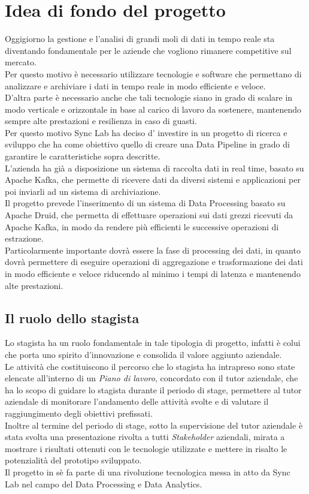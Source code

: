 \section{Idea di fondo del progetto}
Oggigiorno la gestione e l'analisi di grandi moli di dati in tempo reale sta diventando fondamentale 
per le aziende che vogliono rimanere competitive sul mercato. \\ 
Per questo motivo è necessario utilizzare tecnologie e software che permettano di analizzare e archiviare 
i dati in tempo reale in modo efficiente e veloce. \\
D'altra parte è necessario anche che tali tecnologie siano in grado di scalare in modo verticale e orizzontale in base al carico 
di lavoro da sostenere, mantenendo sempre alte prestazioni e resilienza in caso di guasti. \\
Per questo motivo Sync Lab ha deciso d' investire in un progetto di ricerca e sviluppo che ha come obiettivo quello di creare 
una \gls{Data Pipeline}{} in grado di garantire le caratteristiche sopra descritte. \\
L'azienda ha già a disposizione un sistema di raccolta dati in real time, basato su Apache Kafka, che permette di ricevere dati da
diversi sistemi e applicazioni per poi inviarli ad un sistema di archiviazione. \\
Il progetto prevede l'inserimento di un sistema di \gls{Data Processing}{} basato su Apache Druid, che permetta di effettuare operazioni sui dati 
grezzi ricevuti da Apache Kafka, in modo da rendere più efficienti le successive operazioni di estrazione.\\
Particolarmente importante dovrà essere la fase di processing dei dati, in quanto dovrà permettere di eseguire operazioni di aggregazione
e trasformazione dei dati in modo efficiente e veloce riducendo al minimo i tempi di latenza e mantenendo alte prestazioni.\\
\subsection{Il ruolo dello stagista}
Lo stagista ha un ruolo fondamentale in tale tipologia di progetto, infatti è colui che porta uno spirito d'innovazione e consolida il valore aggiunto 
aziendale. \\
Le attività che costituiscono il percorso che lo stagista ha intrapreso sono state elencate all'interno di un \textit{Piano di lavoro}, concordato con il tutor aziendale, che ha lo scopo di guidare lo stagista durante il periodo di stage, permettere al 
tutor aziendale di monitorare l'andamento delle attività svolte e di valutare il raggiungimento degli obiettivi prefissati.\\
Inoltre al termine del periodo di stage, sotto la supervisione del tutor aziendale è stata svolta una presentazione rivolta a tutti \textit{Stakeholder} aziendali, mirata a 
mostrare i risultati ottenuti con le tecnologie utilizzate e mettere in risalto le potenzialità del prototipo sviluppato. \\
Il progetto in sè fa parte di una rivoluzione tecnologica messa in atto da Sync Lab nel campo del \gls{Data Processing}{} e \gls{Data Analytics}{}.\\
\pagebreak
